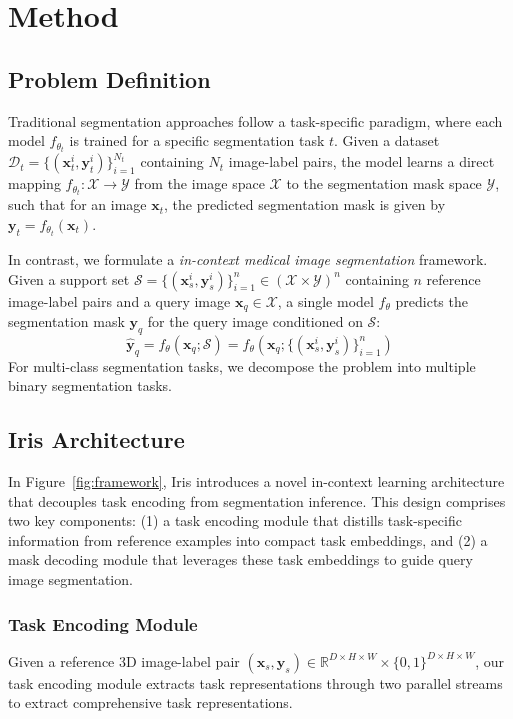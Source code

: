 \section{Method}
\label{sec:method}


\subsection{Problem Definition}
Traditional segmentation approaches follow a task-specific paradigm, where each model $f_{\theta_t}$ is trained for a specific segmentation task $t$. Given a dataset $\mathcal{D}_t = \{(\boldsymbol{x}_{t}^{i}, \boldsymbol{y}_{t}^{i})\}_{i=1}^{N_t}$ containing $N_t$ image-label pairs, the model learns a direct mapping $f_{\theta_t}: \mathcal{X} \rightarrow \mathcal{Y}$ from the image space $\mathcal{X}$ to the segmentation mask space $\mathcal{Y}$, such that for an image $\boldsymbol{x}_t$, the predicted segmentation mask is given by $\boldsymbol{y}_t = f_{\theta_t}(\boldsymbol{x}_t)$. 


In contrast, we formulate a \textit{in-context medical image segmentation} framework. Given a support set $\mathcal{S} = \{(\boldsymbol{x}_s^i, \boldsymbol{y}_s^i)\}_{i=1}^n \in (\mathcal{X} \times \mathcal{Y})^n$ containing $n$ reference image-label pairs and a query image $\boldsymbol{x}_q \in \mathcal{X}$, a single model $f_\theta$ predicts the segmentation mask $\boldsymbol{y}_q$ for the query image conditioned on $\mathcal{S}$:
\begin{equation}
    \boldsymbol{\hat{y}}_q = f_\theta(\boldsymbol{x}_q; \mathcal{S}) = f_\theta(\boldsymbol{x}_q; \{(\boldsymbol{x}_s^i, \boldsymbol{y}_s^i)\}_{i=1}^n)
\end{equation}
For multi-class segmentation tasks, we decompose the problem into multiple binary segmentation tasks.


\subsection{Iris Architecture}
In Figure~\ref{fig:framework}, Iris introduces a novel in-context learning architecture that decouples task encoding from segmentation inference. This design comprises two key components: (1) a task encoding module that distills task-specific information from reference examples into compact task embeddings, and (2) a mask decoding module that leverages these task embeddings to guide query image segmentation.

\subsubsection{Task Encoding Module}
Given a reference 3D image-label pair $(\boldsymbol{x}_s, \boldsymbol{y}_s) \in \mathbb{R}^{D \times H \times W} \times \{0,1\}^{D \times H \times W}$, our task encoding module extracts task representations through two parallel streams to extract comprehensive task representations.

